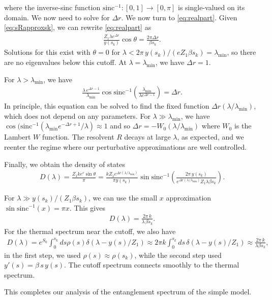 \documentclass[12pt]{article}
\newcommand{\smax}{s_k}
\numberwithin{equation}{section}
\begin{document}
where the inverse-sinc function $\text{sinc}^{-1}: [0,1] \to [0,\pi]$ is single-valued on its domain. We now need to solve for $\Delta r$. We now turn to \eqref{eq:realpart}. Given \eqref{eq:sRapproxsk}, we can rewrite \eqref{eq:realpart} as
\begin{align}
\frac{Z_1 \lambda  e^{ \Delta r}}{y(\smax)} \cos \theta = \frac{2\pi \Delta r}{\beta \smax}.
\end{align}
Solutions for this exist with $\theta = 0$ for $\lambda < 2 \pi\, y(\smax)/ (e Z_1 \beta \smax) = \lambda_\text{min}$, so there are no eigenvalues below this cutoff. At $\lambda = \lambda_\text{min}$, we have $\Delta r = 1$. 

For $\lambda > \lambda_\text{min}$, we have
\begin{align}
\frac{ \lambda\,  e^{ \Delta r - 1}}{\lambda_\text{min}} \cos\text{sinc}^{-1}\left(\frac{\lambda_\text{min}}{ \lambda e^{\Delta r - 1}} \right) = \Delta r.
\end{align}
In principle, this equation can be solved to find the fixed function $\Delta r(\lambda/\lambda_\text{min})$, which does not depend on any parameters. For $\lambda \gg \lambda_\text{min}$, we have $ \cos(\text{sinc}^{-1}\left(\lambda_\text{min}e^{-\Delta r + 1}/ \lambda  \right) \approx 1$ and so $\Delta r = - W_0(\lambda/\lambda_\text{min})$ where $W_0$ is the Lambert $W$ function. The resolvent $R$ decays at large $\lambda$, as expected, and we reenter the regime where our perturbative approximations are well controlled.

Finally, we obtain the density of states
\begin{align} \label{eq:sinsinc}
D(\lambda) = \frac{Z_1 k e^r \sin \theta}{\pi} =  \frac{k Z_1 e^{\Delta r(\lambda/\lambda_\text{min})}}{\pi y(\smax)} \sin \text{sinc}^{-1}\left(\frac{2\pi \, y(\smax) }{e^{\Delta r(\lambda/\lambda_\text{min})} Z_1 \lambda \beta \smax} \right).
\end{align}

For $\lambda \gg y(\smax)/( Z_1 \beta \smax)$, we can use the small $x$ approximation $\sin \text{sinc}^{-1}(x) = \pi x$. This gives
\begin{align}
D(\lambda) = \frac{2 \pi \,k }{ \lambda\, \beta \smax}.
\end{align}
For the thermal spectrum near the cutoff, we also have
\begin{align}
D(\lambda) = e^{S_0} \int_0^{\smax} ds \rho(s) \delta(\lambda - y(s)/Z_1) \approx 2 \pi k \int_0^{\smax} ds  \,\delta(\lambda - y(s)/Z_1) \approx \frac{2 \pi \,k}{\lambda \beta \smax },
\end{align}
in the first step, we used $\rho(s) \approx \rho(\smax)$, while the second step used $y'(s) = \beta\, s\, y(s)$. The cutoff spectrum connects smoothly to the thermal spectrum. 

This completes our analysis of the entanglement spectrum of the simple model.


{\footnotesize

}


\end{document}
